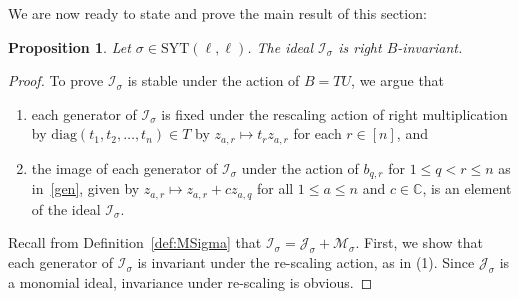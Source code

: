 \documentclass[11pt]{amsart}
\newtheorem{prop}[theorem]{Proposition}
\theoremstyle{remark}
\theoremstyle{remark}
\theoremstyle{definition}
\theoremstyle{definition}
\theoremstyle{definition}
\numberwithin{equation}{section}
\newcommand{\C}{\mathbb{C}}           %
\newcommand{\gs}{\sigma}
\newcommand{\ci}{\mathcal{I}}
\newcommand{\cj}{\mathcal{J}}
\newcommand{\cm}{\mathcal{M}}
\newcommand{\SYT}{\mathrm{SYT}}
\newcommand{\isigma}{\ci_\gs}
\begin{document}
We are now ready to state and prove the main result of this section:


\begin{prop}\label{binv} Let $\gs\in \SYT(\ell, \ell)$. The ideal $\ci_\gs$ is right $B$-invariant. 
\end{prop}



\begin{proof} To prove $\ci_\gs$ is stable under the action of $B=TU$, we argue that 
\begin{enumerate}
\item each generator of $\ci_\gs$ is fixed under the rescaling action of right multiplication by $\mathrm{diag}(t_1,t_2, \ldots, t_n)\in T$ by $z_{a,r} \mapsto t_r z_{a,r}$ for each $r\in [n]$, and 
\item the image of each generator of $\isigma$ under the action of $b_{q,r}$ for $1\leq q<r\leq n$ as in~\eqref{gen}, given by $z_{a,r}\mapsto z_{a,r}+cz_{a,q}$ for all $1\leq a \leq n$ and $c\in \C$, is an element of the ideal $\ci_\gs$.
\end{enumerate}

Recall from Definition~\ref{def:MSigma} that $\ci_\gs = \cj_\gs+\cm_\gs$. First, we show that each generator of $\ci_\gs$ is invariant under the re-scaling action, as in (1). Since $\cj_\gs$ is a monomial ideal, invariance under re-scaling is obvious. 



\end{proof}
\end{document}
